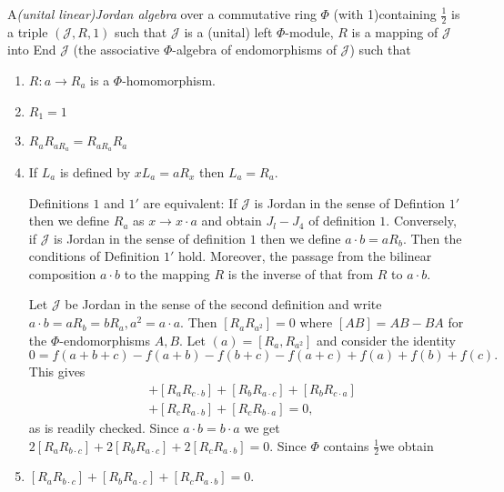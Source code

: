 \begin{defn}\label{c1:defn1}
  A{\em (unital linear)Jordan algebra} over a commutative ring $\Phi$
  (with 1)containing $\frac{1}{2}$ is a triple $(\mathscr{J},R,1)$
  such that $\mathscr{J}$ is a (unital) left $\Phi$-module, $R$ is a
  mapping of $\mathscr{J}$ into End $\mathscr{J}$ (the associative
  $\Phi$-algebra of endomorphisms of $\mathscr{J}$) such that 
  \begin{enumerate}[\rm J1]
  \item $R:a\to R_a$ is a $\Phi$-homomorphism.\pageoriginale
    
  \item $R_1=1$
    
  \item $R_aR_{aR_{a}}=R_{aR_{a}} R_a$
    
  \item If $L_a$ is defined by $xL_a=aR_x$ then $L_a=R_a$.

    Definitions $1$ and $1'$ are equivalent: If $\mathscr{J}$ is
    Jordan in the sense of Defintion $1'$ then we define $R_a$ as
    $x\to x\cdot a$ and obtain $J_l-J_4$ of definition
    $1$. Conversely, if $\mathscr{J}$ is Jordan in the sense of
    definition $1$ then we define $a\cdot b=aR_b$. Then the conditions
    of Definition $1'$ hold. Moreover, the passage from the bilinear
    composition $a\cdot b$ to the mapping $R$ is the inverse of that
    from $R$ to $a\cdot b$. 

    Let $\mathscr{J}$ be Jordan in the sense of the second definition
    and write $a\cdot b=a R_b=bR_a, a^{2}=a\cdot a$. Then
    $[R_aR_{a^{2}}]=0$ where $[AB]=AB-BA$ for the $\Phi$-endomorphisms
    $A, B$. Let $(a)=[R_a, R_{a^{2}}]$ and consider the identity 
    $$
    0=f (a+b+c)-f (a+b)-f (b+c)-f (a+c)+f (a)+f (b)+f (c). 
$$
This gives
\begin{align*}
[R_a R_{b\cdot c}]&+[R_aR_{c\cdot b}]+[R_bR_{a\cdot c}]+[R_b R_{c\cdot a}]\\
&+[R_c R_{a\cdot b}]+[R_c R_{b\cdot a}]=0,
\end{align*}
as is readily checked. Since $a\cdot b=b\cdot a$ we get
$2[R_a R_{b\cdot c}]+2[R_b R_{a\cdot c}]+2[R_c R_{a\cdot b}]=0$. Since $\Phi$ contains $\frac{1}{2}$\pageoriginale we obtain
\item $[R_a R_{b\cdot c}]+[R_b R_{a\cdot c}]+[R_c R_{a\cdot b}]=0$.
\end{enumerate}
\end{defn}

